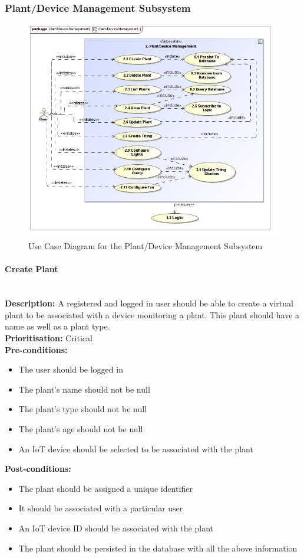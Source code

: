 \documentclass{article}
\begin{document}
\subsubsection{Plant/Device Management Subsystem}

	\begin{figure}[H]
		\includegraphics[width=\linewidth]{images/UseCases/Plant_DeviceManagement.jpg}
		\caption{Use Case Diagram for the Plant/Device Management Subsystem}
	\end{figure}

\paragraph{Create Plant}\mbox{}\\
\textbf{Description:} A registered and logged in user should be able to create a virtual plant to be associated with a device monitoring a plant. This plant should have a name as well as a plant type.\\
\textbf{Prioritisation:} Critical\\		
\textbf{Pre-conditions:}
\begin{itemize}
	\item The user should be logged in
	\item The plant's name should not be null
	\item The plant's type should not be null
	\item The plant's age should not be null
	\item An IoT device should be selected to be associated with the plant
\end{itemize}
\textbf{Post-conditions:}
\begin{itemize}
	\item The plant should be assigned a unique identifier
	\item It should be associated with a particular user
	\item An IoT device ID should be associated with the plant
	\item The plant should be persisted in the database with all the above information
\end{itemize}
\end{document}
